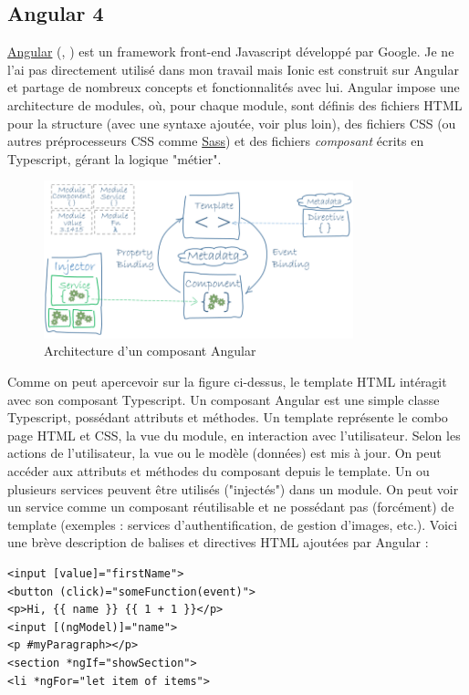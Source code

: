 \documentclass[a4paper, 12pt]{article}
\newenvironment{code}{\captionsetup{type=listing}}{}
\begin{document}
\subsection{Angular 4}
\href{https://angular.io/}{Angular} (\cite{ref15}, \cite{ref21}) est un framework front-end Javascript développé par Google.
Je ne l'ai pas directement utilisé dans mon travail mais Ionic est construit sur Angular et partage de nombreux concepts
et fonctionnalités avec lui.
Angular impose une architecture de modules, où, pour chaque module, sont définis des fichiers HTML pour la structure
(avec une syntaxe ajoutée, voir plus loin), des fichiers CSS (ou autres préprocesseurs CSS comme
\href{http://sass-lang.com/}{Sass}) et des fichiers \textit{composant} écrits en Typescript, gérant la logique "métier".
\begin{figure}
    \begin{center}
        \includegraphics[width=0.8\textwidth]{images/angular2.png}
    \end{center}
    \caption{Architecture d'un composant Angular \cite{ref13}}
\end{figure}
Comme on peut apercevoir sur la figure ci-dessus, le template HTML intéragit avec son composant Typescript.
Un composant Angular est une simple classe Typescript, possédant attributs et méthodes.
Un template représente le combo page HTML et CSS, la vue du module, en interaction avec l'utilisateur.
Selon les actions de l'utilisateur, la vue ou le modèle (données) est mis à jour. On peut accéder aux attributs et méthodes
du composant depuis le template. Un ou plusieurs services peuvent être utilisés ("injectés") dans un module. On peut
voir un service comme un composant réutilisable et ne possédant pas (forcément) de template (exemples : services
d'authentification, de gestion d'images, etc.).
\bigbreak
Voici une brève description de balises et directives HTML ajoutées par Angular :
\begin{code}
    \begin{verbatim}
<input [value]="firstName">
<button (click)="someFunction(event)">
<p>Hi, {{ name }} {{ 1 + 1 }}</p>
<input [(ngModel)]="name">
<p #myParagraph></p>
<section *ngIf="showSection">
<li *ngFor="let item of items">
    \end{verbatim}
    \caption{Syntaxe HTML avec Angular}
\end{code}
\end{document}
